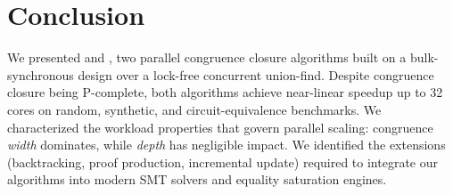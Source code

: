 \section{Conclusion}
\label{sec:conclusion}

We presented \parentalgo and \filteralgo, two parallel congruence closure
algorithms built on a bulk-synchronous design over a lock-free
concurrent union-find. Despite congruence closure being P-complete, both
algorithms achieve near-linear speedup up to 32 cores on random, synthetic,
and circuit-equivalence benchmarks. We characterized the workload properties
that govern parallel scaling: congruence \emph{width} dominates, while
\emph{depth} has negligible impact. We identified the extensions
(backtracking, proof production, incremental update) required to integrate
our algorithms into modern SMT solvers and equality saturation engines.
